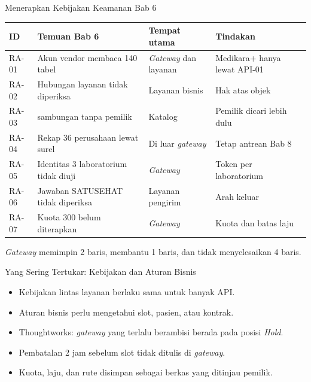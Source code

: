\documentclass[aspectratio=169, table, 12pt]{beamer}
\begin{document}
\begin{frame}{{\Large Menerapkan Kebijakan Keamanan Bab 6}}
  \scriptsize
  \begin{tabularx}{\textwidth}{>{\raggedright\arraybackslash}p{1.1cm} >{\raggedright\arraybackslash}X >{\raggedright\arraybackslash}p{2.7cm} >{\raggedright\arraybackslash}X}
    \hline
    \textbf{ID} & \textbf{Temuan Bab 6} & \textbf{Tempat utama} & \textbf{Tindakan} \\ \hline
    RA-01 & Akun vendor membaca 140 tabel & \textit{Gateway} dan layanan & Medikara+ hanya lewat API-01 \\ \hline
    RA-02 & Hubungan layanan tidak diperiksa & Layanan bisnis & Hak atas objek \\ \hline
    RA-03 & 12 sambungan tanpa pemilik & Katalog & Pemilik dicari lebih dulu \\ \hline
    RA-04 & Rekap 36 perusahaan lewat surel & Di luar \textit{gateway} & Tetap antrean Bab 8 \\ \hline
    RA-05 & Identitas 3 laboratorium tidak diuji & \textit{Gateway} & Token per laboratorium \\ \hline
    RA-06 & Jawaban SATUSEHAT tidak diperiksa & Layanan pengirim & Arah keluar \\ \hline
    RA-07 & Kuota 300 belum diterapkan & \textit{Gateway} & Kuota dan batas laju \\ \hline
  \end{tabularx}

  \vspace{6pt}
  \small \textit{Gateway} memimpin 2 baris, membantu 1 baris, dan tidak menyelesaikan 4 baris.
\end{frame}

\begin{frame}{{\Large Yang Sering Tertukar: Kebijakan dan Aturan Bisnis}}
  \vspace{8pt}
  \begin{itemize}
    \item Kebijakan lintas layanan berlaku sama untuk banyak API.
    \item Aturan bisnis perlu mengetahui slot, pasien, atau kontrak.
    \item Thoughtworks: \textit{gateway} yang terlalu berambisi berada pada posisi \textit{Hold}.
    \item Pembatalan 2 jam sebelum slot tidak ditulis di \textit{gateway}.
    \item Kuota, laju, dan rute disimpan sebagai berkas yang ditinjau pemilik.
  \end{itemize}
\end{frame}
\end{document}
